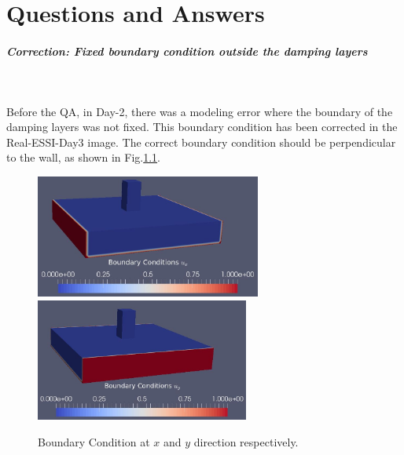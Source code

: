\clearpage
\newpage

\chapter{Questions and Answers}
\label{ch-QA}


\paragraph{Correction: Fixed boundary condition outside the damping layers} ~

Before the QA, in Day-2, there was a modeling error where the boundary of the damping layers was not fixed.
This boundary condition has been corrected in the Real-ESSI-Day3 image. 
The correct boundary condition should be perpendicular to the wall, as shown in Fig.\ref{fig_BC_xy}.

\begin{figure}[H]
  \centering
  \includegraphics[width = 7.4cm]{./Figure-files/QA/boundary_condition_ux.png}
  \includegraphics[width = 7cm]{./Figure-files/QA/boundary_condition_uy.png}
  \caption{Boundary Condition at $x$ and $y$ direction respectively.}
  \label{fig_BC_xy}
\end{figure}

